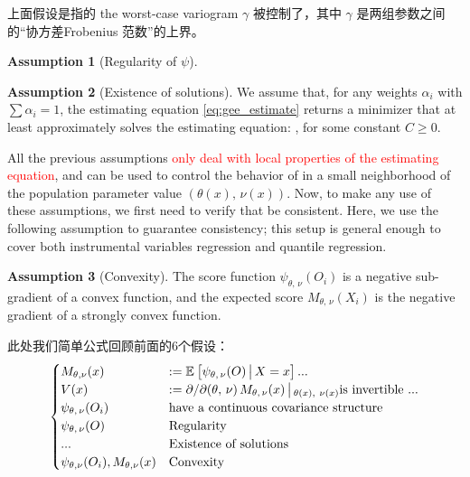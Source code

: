 \documentclass[aos]{imsart}
\theoremstyle{plain}
\theoremstyle{definition}
\newtheorem{assu}{Assumption}
\theoremstyle{remark}
\begin{document}
\begin{CJK}{UTF8}{gbsn}
上面假设是指的 the worst-case variogram $\gamma$ 被控制了，其中 $\gamma$ 是两组参数之间的“协方差Frobenius 范数”的上界。

\begin{assu}[Regularity of $\psi$]
\label{assu:donsker}
\end{assu}

\begin{assu}[Existence of solutions]
\label{assu:existence}
We assume that, for any weights $\alpha_i$ with $\sum \alpha_i = 1$,
the estimating equation \eqref{eq:gee_estimate} returns a
minimizer \smash{$(\htheta, \, \hnu)$} that at least approximately
solves the estimating equation:
,
for some constant $C \geq 0$.
\end{assu}

All the previous assumptions \textcolor{red}{only deal with local properties of the estimating
equation}, and can be used to control the behavior of 
in a small neighborhood of the population parameter value $(\theta(x), \, \nu(x))$.
Now, to make any use of these assumptions, we first need to verify that 
 be consistent. Here, we use the following assumption
to guarantee consistency; this setup is general enough to cover both instrumental
variables regression and quantile regression.

\begin{assu}[Convexity]
\label{assu:convexity}
The score function $\psi_{\theta, \, \nu}(O_i)$ is a negative sub-gradient of a convex function,
and the expected score $M_{\theta, \, \nu}(X_i)$ is the negative gradient of a strongly convex function.
\end{assu}

此处我们简单公式回顾前面的6个假设：
\begin{equation*}
\begin{cases}
M_{\theta, \nu}(x) &:= \EE{\psi_{\theta, \, \nu}(O) \cond X = x} ... \\
V(x) &:= {\partial}/{\partial (\theta, \, \nu)} \, M_{\theta, \, \nu}(x) \cond_{\theta(x), \ \nu(x)} \text{is invertible ...} \\ 
\psi_{\theta, \, \nu}(O_i) &\text{have a continuous covariance structure} \\
\psi_{\theta, \, \nu}(O) &\text{Regularity} \\
... &\text{Existence of solutions} \\
\psi_{\theta, \nu}(O_i), M_{\theta, \nu}(x) &\text{Convexity}
\end{cases}
\end{equation*}


\end{CJK}
\end{document}
